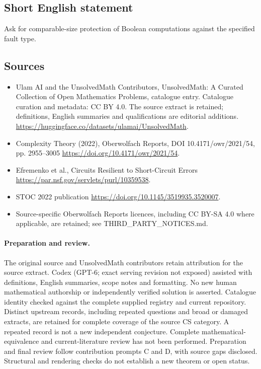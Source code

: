\documentclass[11pt]{article}
\begin{document}
\subsection{Short English statement}
Ask for comparable-size protection of Boolean computations against the specified fault type.
\subsection{Sources}
\begin{itemize}
\item[\hypertarget{source:statement:1}{S1}] Ulam AI and the UnsolvedMath Contributors, UnsolvedMath: A Curated Collection of Open Mathematics Problems, catalogue entry. Catalogue curation and metadata: CC BY 4.0. The source extract is retained; definitions, English summaries and qualifications are editorial additions.
\url{https://huggingface.co/datasets/ulamai/UnsolvedMath}.
\item[\hypertarget{source:statement:2}{S2}] Complexity Theory (2022), Oberwolfach Reports, DOI 10.4171/owr/2021/54, pp. 2955--3005
\url{https://doi.org/10.4171/owr/2021/54}.
\item[\hypertarget{source:statement:3}{S3}] Efremenko et al., Circuits Resilient to Short-Circuit Errors
\url{https://par.nsf.gov/servlets/purl/10359538}.
\item[\hypertarget{source:statement:4}{S4}] STOC 2022 publication
\url{https://doi.org/10.1145/3519935.3520007}.
\item Source-specific Oberwolfach Reports licences, including CC BY-SA 4.0 where applicable, are retained; see THIRD\_PARTY\_NOTICES.md.
\end{itemize}
\paragraph{Preparation and review.}
The original source and UnsolvedMath contributors retain attribution for the source extract. Codex (GPT-6; exact serving revision not exposed) assisted with definitions, English summaries, scope notes and formatting. No new human mathematical authorship or independently verified solution is asserted. Catalogue identity checked against the complete supplied registry and current repository. Distinct upstream records, including repeated questions and broad or damaged extracts, are retained for complete coverage of the source CS category. A repeated record is not a new independent conjecture. Complete mathematical-equivalence and current-literature review has not been performed. Preparation and final review follow contribution prompts C and D, with source gaps disclosed. Structural and rendering checks do not establish a new theorem or open status.
\label{end:statement}
\end{document}
